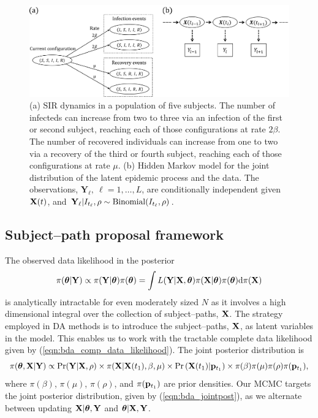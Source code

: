 \begin{figure}
	\centering
	\includegraphics[width=0.95\linewidth]{figures/SIRdynamics_HMM}
	\caption{(a) SIR dynamics in a population of five subjects. The number of infecteds can increase from two to three via an infection of the first or second subject, reaching each of those configurations at rate $ 2\beta $. The number of recovered individuals can increase from one to two via a recovery of the third or fourth subject, reaching each of those configurations at rate $ \mu $. (b) Hidden Markov model for the joint distribution of the latent epidemic process and the data. The observations, $\mathbf{Y}_\ell,\ \ell=1,\dots,L$, are conditionally independent given $\mathbf{X}(t)$, and $ \mathbf{Y}_\ell | I_{t_\ell}, \rho\sim\mathrm{Binomial}(I_{t_\ell}, \rho) $.}
	\label{fig:bda_SIRdynamics_HMM}
\end{figure}

\subsection{Subject--path proposal framework}
\label{subsec:bda_subj_proc}
The observed data likelihood in the posterior  $$ \pi(\boldsymbol{\theta}|\mathbf{Y}) \propto \pi(\mathbf{Y}|\boldsymbol{\theta})\pi(\boldsymbol{\theta})=\int L(\mathbf{Y}|\mathbf{X}, \boldsymbol{\theta}) \pi(\mathbf{X}|\boldsymbol{\theta}) \pi(\boldsymbol{\theta}) \mathrm{d}\pi(\mathbf{X})$$
is analytically intractable for even moderately sized $ N $ as it involves a  high dimensional integral over the collection of subject--paths, $ \mathbf{X} $. The strategy employed in DA methods is to introduce the subject--paths, $ \mathbf{X} $, as latent variables in the model. This enables us to work with the tractable complete data likelihood given by (\ref{eqn:bda_comp_data_likelihood}). The joint posterior distribution is \begin{equation}
\label{eqn:bda_jointpost}
\pi(\boldsymbol{\theta}, \mathbf{X}| \mathbf{Y}) \propto \Pr(\mathbf{Y}|\mathbf{X},\rho) \times\pi(\mathbf{X}|\mathbf{X}(t_1),\beta,\mu) \times \Pr\left (\mathbf{X}(t_1)|\mathbf{p}_{t_1}\right) \times\pi(\beta)\pi(\mu) \pi(\rho) \pi(\mathbf{p}_{t_1}),
\end{equation} where $ \pi(\beta)$, $\pi(\mu)$, $\pi(\rho)$, and $\pi(\mathbf{p}_{t_1}) $ are prior densities. Our MCMC targets the joint posterior distribution, given by (\ref{eqn:bda_jointpost}), as we alternate between updating $ \mathbf{X}|\boldsymbol{\theta},\mathbf{Y} $ and $ \boldsymbol{\theta}|\mathbf{X},\mathbf{Y} $. 

